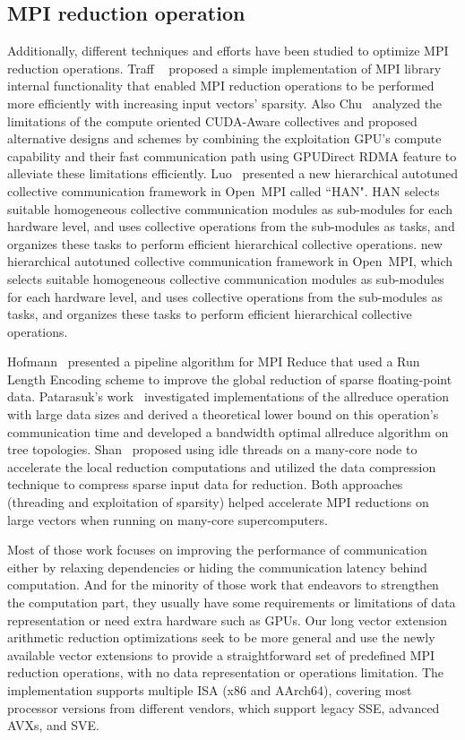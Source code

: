 \documentclass[5p,times,twocolumn]{elsarticle}
\newcommand{\ompi}[0]{Open~MPI\xspace}
\newcommand{\mpi}[0]{\textsc{MPI}\xspace}
\begin{document}
\subsection{\mpi reduction operation}
Additionally, different techniques and
efforts have been studied to optimize \mpi reduction operations. Traff
~\cite{NeutralMPIReduction} proposed a simple implementation of MPI library
internal functionality that enabled MPI reduction operations to be performed
more efficiently with increasing input vectors' sparsity.
%
Also Chu~\cite{gpu-reduce} analyzed the limitations of the compute oriented CUDA-Aware
collectives and proposed alternative designs and schemes by combining the exploitation GPU's
compute capability and their fast communication
path using GPUDirect RDMA feature to alleviate these limitations efficiently.
%
Luo~\cite{luo-han} presented a new hierarchical autotuned collective communication
framework in \ompi called ``HAN". HAN selects suitable homogeneous collective communication
modules as sub-modules for each hardware level, and uses collective operations from
the sub-modules as tasks, and organizes these tasks to perform efficient hierarchical collective operations.
%
new hierarchical autotuned collective communication
framework in \ompi, which selects suitable homogeneous collective communication
modules as sub-modules for each hardware level, and uses collective operations from
the sub-modules as tasks, and organizes these tasks to perform efficient hierarchical collective operations.


Hofmann~\cite{sparse-reduction} presented a pipeline algorithm for MPI Reduce
that used a Run Length Encoding scheme to improve the global reduction of sparse
floating-point data.
Patarasuk's work~\cite{allreduce-optimal} investigated implementations of the allreduce operation
with large data sizes and derived a theoretical lower bound on this operation's communication time and developed
a bandwidth optimal allreduce algorithm on tree topologies.
%
Shan~\cite{shan-reduce} proposed using idle threads on a many-core node to accelerate
the local reduction computations and utilized the data compression technique to compress sparse input data for reduction.
Both approaches (threading and exploitation
of sparsity) helped accelerate MPI reductions on large vectors when
running on many-core supercomputers.
%

Most of those work focuses on improving the performance of
communication either by relaxing dependencies or hiding the communication latency behind computation.
And for the minority of those work that endeavors to strengthen the computation part,
they usually have some requirements or limitations of data
representation or need extra hardware such as GPUs.
Our long vector extension arithmetic reduction
optimizations seek to be more general and use the newly available vector extensions to provide a
straightforward set of predefined MPI reduction operations, with no data representation or operations limitation.
The implementation supports multiple ISA (x86 and AArch64), covering most processor versions from different vendors,
which support legacy SSE, advanced AVXs, and SVE.
\end{document}
